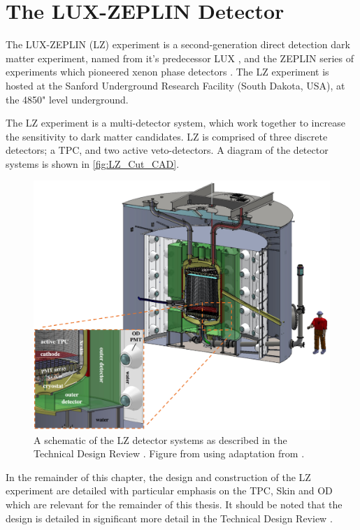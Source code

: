 \section{The LUX-ZEPLIN Detector}
\label{sec:lz_detector}
\par
The LUX-ZEPLIN (LZ) experiment is a second-generation direct detection dark matter experiment, named from it's predecessor LUX \cite{lux_ref}, and the ZEPLIN series of experiments which pioneered xenon phase detectors \cite{zeplin_3_ref}.
The LZ experiment is hosted at the Sanford Underground Research Facility (South Dakota, USA), at the 4850" level underground.


\par
The LZ experiment is a multi-detector system, which work together to increase the sensitivity to dark matter candidates.
LZ is comprised of three discrete detectors; a TPC, and two active veto-detectors.
A diagram of the detector systems is shown in \autoref{fig:LZ_Cut_CAD}.

\begin{figure}
    \centering
    \includegraphics[width=\textwidth]{Figures/LZ/LZ_CAD_with_interactions.png}
    \caption{A schematic of the LZ detector systems as described in the Technical Design Review \cite{LZ_TechnicalDesignReview_ref}.
             Figure from \cite{LZ_TechnicalDesignReview_ref} using adaptation from \cite{LZ_Ibles_LZStats_Thesis_ref}.}
    \label{fig:LZ_Cut_CAD}
\end{figure}

\par
In the remainder of this chapter, the design and construction of the LZ experiment are detailed with particular emphasis on the TPC, Skin and OD which are relevant for the remainder of this thesis. 
It should be noted that the design is detailed in significant more detail in the Technical Design Review \cite{LZ_TechnicalDesignReview_ref}.

